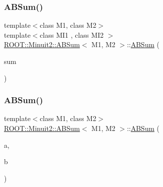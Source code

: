 \subsubsection{\texorpdfstring{ABSum()}{ABSum()}\hspace{0.1cm}{\footnotesize\ttfamily [6/9]}}
{\footnotesize\ttfamily template$<$class M1, class M2$>$ \\
template$<$class M\+I1 , class M\+I2 $>$ \\
\mbox{\hyperlink{classROOT_1_1Minuit2_1_1ABSum}{R\+O\+O\+T\+::\+Minuit2\+::\+A\+B\+Sum}}$<$ M1, M2 $>$\+::\mbox{\hyperlink{classROOT_1_1Minuit2_1_1ABSum}{A\+B\+Sum}} (\begin{DoxyParamCaption}\item[{const \mbox{\hyperlink{classROOT_1_1Minuit2_1_1ABSum}{A\+B\+Sum}}$<$ M\+I1, M\+I2 $>$ \&}]{sum }\end{DoxyParamCaption})\hspace{0.3cm}{\ttfamily [inline]}}

\mbox{\label{classROOT_1_1Minuit2_1_1ABSum_adaac8ec05b73e9e86e736faab9a685fe}} 
\subsubsection{\texorpdfstring{ABSum()}{ABSum()}\hspace{0.1cm}{\footnotesize\ttfamily [7/9]}}
{\footnotesize\ttfamily template$<$class M1, class M2$>$ \\
\mbox{\hyperlink{classROOT_1_1Minuit2_1_1ABSum}{R\+O\+O\+T\+::\+Minuit2\+::\+A\+B\+Sum}}$<$ M1, M2 $>$\+::\mbox{\hyperlink{classROOT_1_1Minuit2_1_1ABSum}{A\+B\+Sum}} (\begin{DoxyParamCaption}\item[{const M1 \&}]{a,  }\item[{const M2 \&}]{b }\end{DoxyParamCaption})\hspace{0.3cm}{\ttfamily [inline]}}

\mbox{\label{classROOT_1_1Minuit2_1_1ABSum_ab2d4441bcbcb38be86091d5eda7b63b2}} 
